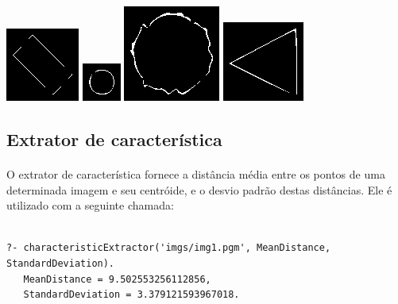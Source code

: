 \documentclass{article}
\begin{document}
\begin{center}
\includegraphics[scale=1.00]{texImgs/border_img6.eps}
\includegraphics[scale=1.00]{texImgs/border_img7.eps}
\includegraphics[scale=1.00]{texImgs/border_img8.eps}
\includegraphics[scale=1.00]{texImgs/border_img9.eps}
\end{center}


\subsection*{Extrator de característica}
\paragraph{}
	O extrator de característica fornece a distância média entre os pontos de uma determinada imagem e seu centróide, e o desvio padrão destas distâncias. Ele é utilizado com a seguinte chamada:

\begin{center}
\begin{minipage}{13cm}
\begin{Verbatim}

?- characteristicExtractor('imgs/img1.pgm', MeanDistance, StandardDeviation).
   MeanDistance = 9.502553256112856,
   StandardDeviation = 3.379121593967018.

\end{Verbatim}
\end{minipage}
\end{center}	
\end{document}
